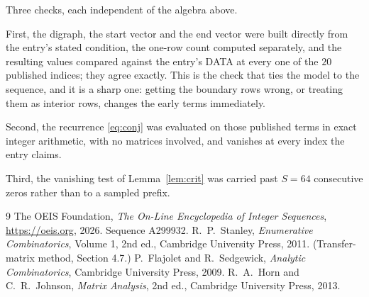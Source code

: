 \documentclass[11pt,a4paper]{article}
\theoremstyle{plain}
\theoremstyle{definition}
\begin{document}
Three checks, each independent of the algebra above.

First, the digraph, the start vector and the end vector were built directly from the
entry's stated condition, the one-row count computed separately, and the resulting values
compared against the entry's DATA at every one of the $20$ published indices; they
agree exactly. This is the check that ties the model to the sequence, and it is a sharp one:
getting the boundary rows wrong, or treating them as interior rows, changes the early terms
immediately.

Second, the recurrence \eqref{eq:conj} was evaluated on those published terms in exact
integer arithmetic, with no matrices involved, and vanishes at every index the entry claims.

Third, the vanishing test of Lemma~\ref{lem:crit} was carried past $S=64$ consecutive
zeros rather than to a sampled prefix.

\begin{thebibliography}{9}
 The OEIS Foundation, \emph{The On-Line Encyclopedia of Integer
Sequences}, \url{https://oeis.org}, 2026. Sequence A299932.
 R.~P.~Stanley, \emph{Enumerative Combinatorics}, Volume 1, 2nd ed.,
Cambridge University Press, 2011. (Transfer-matrix method, Section 4.7.)
 P.~Flajolet and R.~Sedgewick, \emph{Analytic Combinatorics}, Cambridge
University Press, 2009.
 R.~A.~Horn and C.~R.~Johnson, \emph{Matrix Analysis}, 2nd ed., Cambridge
University Press, 2013.
\end{thebibliography}
\end{document}
